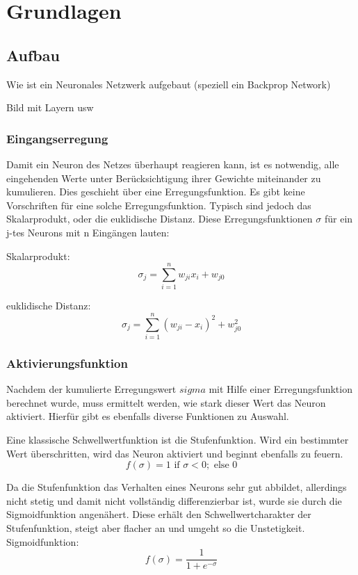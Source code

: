 \section{Grundlagen}

\subsection{Aufbau}
Wie ist ein Neuronales Netzwerk aufgebaut (speziell ein Backprop Network)

Bild mit Layern usw


\subsubsection{Eingangserregung}
Damit ein Neuron des Netzes überhaupt reagieren kann, ist es notwendig, alle eingehenden Werte unter Berücksichtigung ihrer Gewichte miteinander zu kumulieren. Dies geschieht über eine Erregungsfunktion. Es gibt keine Vorschriften für eine solche Erregungsfunktion. Typisch sind jedoch das Skalarprodukt, oder die euklidische Distanz. Diese Erregungsfunktionen $\sigma$ für ein j-tes Neurons mit n Eingängen lauten:

Skalarprodukt:
\begin{equation}
  \sigma_{j} = \sum_{i=1}^{n} w_{ji} x_{i}+w_{j0}
\end{equation} 

euklidische Distanz:
\begin{equation}
  \sigma_{j} = \sum_{i=1}^{n} (w_{ji} - x_{i})^2+w_{j0}^2
\end{equation} 

\subsubsection{Aktivierungsfunktion}
Nachdem der kumulierte Erregungswert $sigma$ mit Hilfe einer Erregungsfunktion berechnet wurde, muss ermittelt werden, wie stark dieser Wert das Neuron aktiviert. Hierfür gibt es ebenfalls diverse Funktionen zu Auswahl.

Eine klassische Schwellwertfunktion ist die Stufenfunktion. Wird ein bestimmter Wert überschritten, wird das Neuron aktiviert und beginnt ebenfalls zu feuern.
\begin{equation}
f(\sigma) = 1 \mbox{ if } \sigma < 0;  \mbox{ else } 0
\end{equation}

Da die Stufenfunktion das Verhalten eines Neurons sehr gut abbildet, allerdings nicht stetig und damit nicht vollständig differenzierbar ist, wurde sie durch die Sigmoidfunktion angenähert. Diese erhält den Schwellwertcharakter der Stufenfunktion, steigt aber flacher an und umgeht so die Unstetigkeit.
Sigmoidfunktion:
\begin{equation}
f(\sigma) = \frac{1}{1+e^{-\sigma}}
\end{equation}

